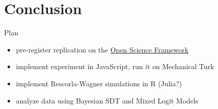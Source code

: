 \documentclass{beamer}\usepackage[]{graphicx}\usepackage[]{color}
\begin{document}
\section{Conclusion}
\begin{frame}{Plan}
    \begin{itemize}[<+->]
        \item pre-register replication on the \href{http://osf.io}{Open Science Framework}
        \item implement experiment in JavaScript, run it on Mechanical Turk
        \item implement Rescorla-Wagner simulations in R (Julia?)
        \item analyze data using Bayesian SDT and Mixed Logit Models
    \end{itemize}
\end{frame}
\end{document}
